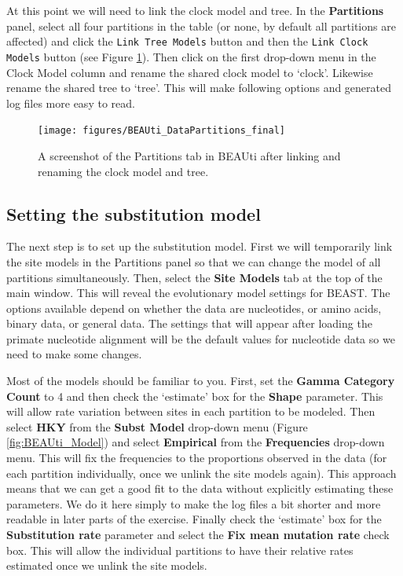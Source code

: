 \documentclass[11pt]{article}
\theoremstyle{plain}%
\theoremstyle{definition}
\theoremstyle{remark}
\begin{document}
At this point we will need to link the clock model and tree. In the {\bf Partitions} panel, select all four partitions in the table (or none, by default all partitions are affected) and click the \texttt{Link Tree Models} button and then the \texttt{Link Clock Models} button (see Figure \ref{fig:BEAUti_DataPartitions_final}). Then click on the first drop-down menu in the Clock Model column and rename the shared clock model to `clock'. Likewise rename the shared tree to `tree'. This will make following options and generated log files more easy to read.

\begin{figure}

\texttt{[image: figures/BEAUti\_DataPartitions\_final]}
\caption{A screenshot of the Partitions tab in BEAUti after linking and renaming the clock model and tree.}
\label{fig:BEAUti_DataPartitions_final}
\end{figure}

\subsection{Setting the substitution model}

The next step is to set up the substitution model. First we will temporarily link the site models in the Partitions panel so that we can change the model of all partitions simultaneously. Then, select the {\bf Site Models} tab at the top of the
main window. This will reveal the evolutionary model settings for
BEAST. The options available depend on whether the data are
nucleotides, or amino acids, binary data, or general data.
The settings that will appear after loading the primate nucleotide alignment will
be the default values for nucleotide data so we need to make some changes. 

Most of the models should be familiar to you. %
First, set the \textbf{Gamma Category Count} to 4 and then check the `estimate' box for the \textbf{Shape} parameter. This will allow rate variation 
between sites in each partition to be modeled.  Then select  \textbf{HKY} from the \textbf{Subst Model} drop-down menu (Figure \ref{fig:BEAUti_Model}) and select \textbf{Empirical} from the \textbf{Frequencies} drop-down menu. This will fix the frequencies to the proportions observed in the data (for each partition individually, once we unlink the site models again). This approach means that we can get a good fit to the data without explicitly estimating these parameters. We do it here simply to make the log files a bit shorter and more readable in later parts of the exercise. Finally check the `estimate' box for the \textbf{Substitution rate} parameter and select the \textbf{Fix mean mutation rate} check box. This will allow the individual partitions to have their relative rates estimated once we unlink the site models.
\end{document}
